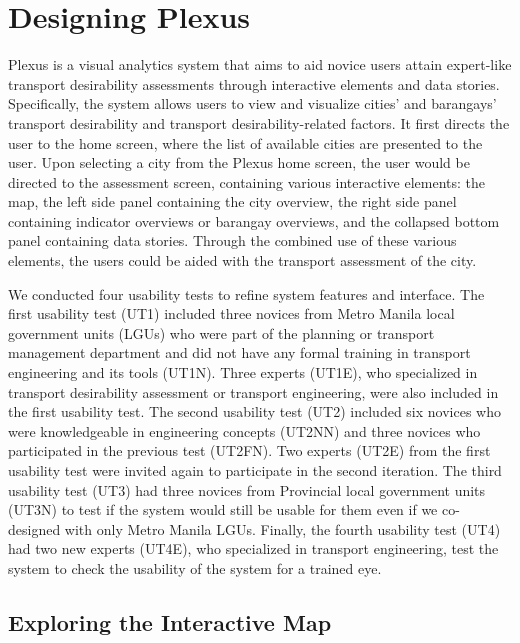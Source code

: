 \documentclass{sigchi}
\begin{document}
\section{Designing Plexus}
Plexus is a visual analytics system that aims to aid novice users attain expert-like transport desirability assessments through interactive elements and data stories. Specifically, the system allows users to view and visualize cities' and barangays' transport desirability and transport desirability-related factors. It first directs the user to the home screen, where the list of available cities are presented to the user. Upon selecting a city from the Plexus home screen, the user would be directed to the assessment screen, containing various interactive elements: the map, the left side panel containing the city overview, the right side panel containing indicator overviews or barangay overviews, and the collapsed bottom panel containing data stories. Through the combined use of these various elements, the users could be aided with the transport assessment of the city.

We conducted four usability tests to refine system features and interface. The first usability test (UT1) included three novices from Metro Manila local government units (LGUs) who were part of the planning or transport management department and did not have any formal training in transport engineering and its tools (UT1N). Three experts (UT1E), who specialized in transport desirability assessment or transport engineering, were also included in the first usability test. The second usability test (UT2) included six novices who were knowledgeable in engineering concepts (UT2NN) and three novices who participated in the previous test (UT2FN). Two experts (UT2E) from the first usability test were invited again to participate in the second iteration. The third usability test (UT3) had three novices from Provincial local government units (UT3N) to test if the system would still be usable for them even if we co-designed with only Metro Manila LGUs. Finally, the fourth usability test (UT4) had two new experts (UT4E), who specialized in transport engineering, test the system to check the usability of the system for a trained eye.

\subsection{Exploring the Interactive Map}
\end{document}
